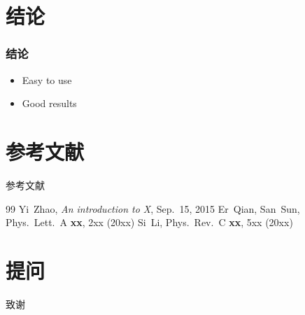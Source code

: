 \documentclass[10pt,aspectratio=43,serif]{beamer}
\begin{document}
\section{结论}
\begin{frame}
    \frametitle{结论}

    \begin{itemize}
        \item Easy to use
        \item Good results
    \end{itemize}
\end{frame}

\section{参考文献}
\begin{frame}{参考文献}
    \begin{thebibliography}{99}
         Yi~Zhao, {\sl An introduction to X}, Sep.~15,
        2015
         Er~Qian, San~Sun, Phys.\ Lett.\ A {\bf xx},
        2xx (20xx)
         Si~Li, Phys.\ Rev.\ C {\bf xx}, 5xx (20xx)
    \end{thebibliography}
\end{frame}

\section{提问}
\begin{frame}{致谢}
    \begin{center}
    \end{center}
\end{frame}
\end{document}
